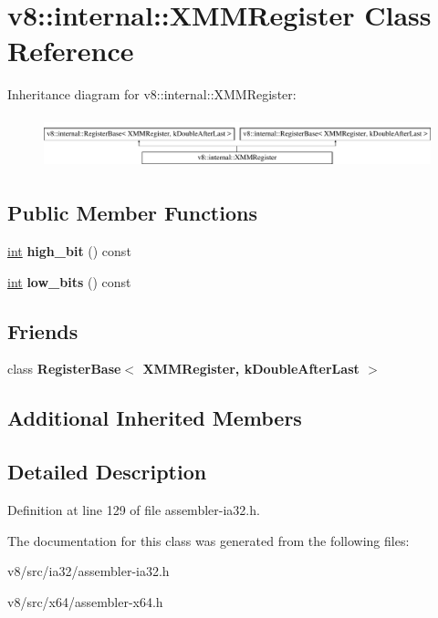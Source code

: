 \hypertarget{classv8_1_1internal_1_1XMMRegister}{}\section{v8\+:\+:internal\+:\+:X\+M\+M\+Register Class Reference}
\label{classv8_1_1internal_1_1XMMRegister}
Inheritance diagram for v8\+:\+:internal\+:\+:X\+M\+M\+Register\+:\begin{figure}[H]
\begin{center}
\leavevmode
\includegraphics[height=1.517615cm]{classv8_1_1internal_1_1XMMRegister}
\end{center}
\end{figure}
\subsection*{Public Member Functions}
\begin{DoxyCompactItemize}
\item 
\mbox{\label{classv8_1_1internal_1_1XMMRegister_a093d2fb4379f4770c8fb5ef4212ec27f}} 
\mbox{\hyperlink{classint}{int}} {\bfseries high\+\_\+bit} () const
\item 
\mbox{\label{classv8_1_1internal_1_1XMMRegister_a950dff6e6edae067ca5c090300cfebc3}} 
\mbox{\hyperlink{classint}{int}} {\bfseries low\+\_\+bits} () const
\end{DoxyCompactItemize}
\subsection*{Friends}
\begin{DoxyCompactItemize}
\item 
\mbox{\label{classv8_1_1internal_1_1XMMRegister_a1866a494bdabcbbcac317a7ea95f2c9d}} 
class {\bfseries Register\+Base$<$ X\+M\+M\+Register, k\+Double\+After\+Last $>$}
\end{DoxyCompactItemize}
\subsection*{Additional Inherited Members}


\subsection{Detailed Description}


Definition at line 129 of file assembler-\/ia32.\+h.



The documentation for this class was generated from the following files\+:\begin{DoxyCompactItemize}
\item 
v8/src/ia32/assembler-\/ia32.\+h\item 
v8/src/x64/assembler-\/x64.\+h\end{DoxyCompactItemize}
